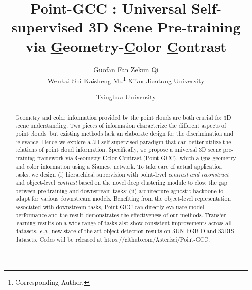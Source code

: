 \documentclass{article}
\title{{
Point-GCC
}: Universal Self-supervised 3D Scene Pre-training via \underline{G}eometry-\underline{C}olor \underline{C}ontrast}
\author{Guofan Fan
  \And
  Zekun Qi \\
  \And
  Wenkai Shi
  \And
  Kaisheng Ma\thanks{Corresponding Author.}
  \AND
  \normalfont  Xi'an Jiaotong University \and 
  \normalfont  Tsinghua University \\
}
\def\eg{{\it{e.g.}}}
\begin{document}
\maketitle


\begin{abstract}
  Geometry and color information provided by the point clouds are both crucial for 3D scene understanding. Two pieces of information characterize the different aspects of point clouds, but existing methods lack an elaborate design for the discrimination and relevance. Hence we explore a 3D self-supervised paradigm that can better utilize the relations of point cloud information. Specifically, we propose a universal 3D scene pre-training framework via \textbf{G}eometry-\textbf{C}olor \textbf{C}ontrast (Point-GCC), which aligns geometry and color information using a Siamese network. 
  To take care of actual application tasks, we design 
  (i) hierarchical supervision with point-level \textit{contrast and reconstruct} and object-level \textit{contrast} based on the novel deep clustering module to close the gap between pre-training and downstream tasks; 
  (ii) architecture-agnostic backbone to adapt for various downstream models. Benefiting from the object-level representation associated with downstream tasks, Point-GCC can directly evaluate model performance and the result demonstrates the effectiveness of our methods. Transfer learning results on a wide range of tasks also show consistent improvements across all datasets. \eg, new state-of-the-art object detection results on SUN RGB-D and S3DIS datasets. Codes will be released at \url{https://github.com/Asterisci/Point-GCC}.
\end{abstract}
\end{document}
